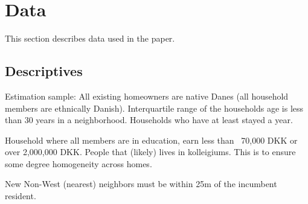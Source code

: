 \documentclass[main.tex]{subfiles}
\begin{document}
\section{Data}
\label{sec:data}
This section describes data used in the paper.


\subsection{Descriptives}
Estimation sample: 
All existing homeowners are native Danes (all household members are ethnically Danish). Interquartile range of the households age is less than 30 years in a neighborhood. Households who have at least stayed a year. 

Household where all members are in education, earn less than ~70,000 DKK or over 2,000,000 DKK. People that (likely) lives in kolleigiums. This is to ensure some degree homogeneity across homes. 

New Non-West (nearest) neighbors must be within 25m of the incumbent resident. 
\end{document}
